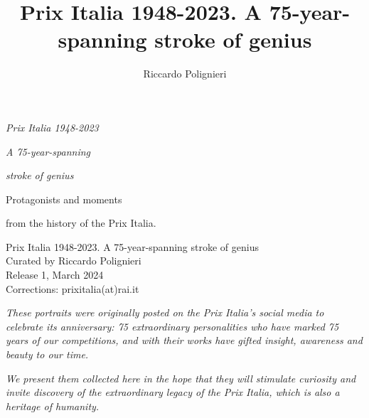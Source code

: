 \documentclass[11pt, oneside]{book}
\title{Prix Italia 1948-2023. A 75-year-spanning stroke of genius}
\author{Riccardo Polignieri}
\date{}
\begin{document}

\thispagestyle{empty}

\newpage\thispagestyle{empty} %
\null\vfill

\newpage\thispagestyle{empty}
\setcounter{page}{1} %
\null\vspace{150pt}
\hfill{\LARGE\slshape Prix Italia 1948-2023}

\bigskip

\hfill{\LARGE\slshape A 75-year-spanning}

\hfill{\LARGE\slshape stroke of genius}

\bigskip
\bigskip

\hfill{\large Protagonists and moments}

\hfill{\large from the history of the Prix Italia.}

\vfill

\newpage\thispagestyle{empty}
\null\vfill
{\footnotesize\ttfamily\noindent Prix Italia 1948-2023. A 75-year-spanning stroke of genius\\Curated by Riccardo Polignieri\\Release 1, March 2024\\Corrections: prixitalia(at)rai.it}

\newpage
\null\vspace{150pt}

{\noindent\large\slshape These portraits were originally posted on the Prix Italia's social media to celebrate its anniversary: 75 extraordinary personalities who have marked 75 years of our competitions, and with their works have gifted insight, awareness and beauty to our time.}

{\noindent\large\slshape We present them collected here in the hope that they will stimulate curiosity and invite discovery of the extraordinary legacy of the Prix Italia, which is also a heritage of humanity.}
 
\vfill

\newpage
\end{document}
